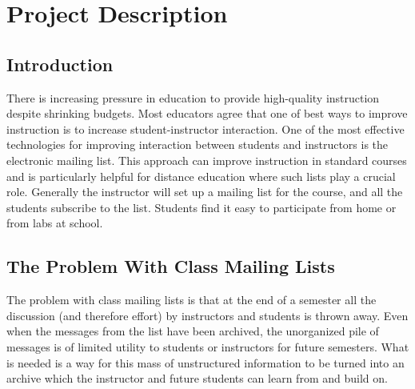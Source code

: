 
\setlength{\oddsidemargin}{0in}
\setlength{\textwidth}{7in}

\section{Project Description}

\subsection{Introduction}
There is increasing pressure in education to provide high-quality instruction
despite shrinking budgets. Most educators agree that one of best ways to
improve instruction is to increase student-instructor interaction. One of the
most effective technologies for improving interaction between students and
instructors is the electronic mailing list. This approach can improve
instruction in standard courses and is particularly helpful for distance
education where such lists play a crucial role. Generally the instructor will
set up a mailing list for the course, and all the students subscribe to the
list. Students find it easy to participate from home or from labs at school.

\subsection{The Problem With Class Mailing Lists}
The problem with class mailing lists is that at the end of a semester all the
discussion (and therefore effort) by instructors and students is thrown away.
Even when the messages from the list have been archived, the unorganized pile
of messages is of limited utility to students or instructors for future
semesters. What is needed is a way for this mass of unstructured information to
be turned into an archive which the instructor and future students can learn
from and build on.

